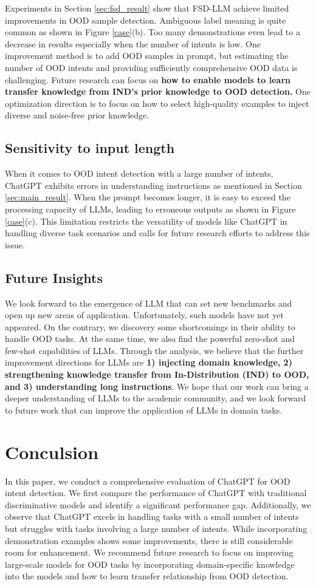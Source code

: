 \documentclass[10pt, a4paper]{article}
\begin{document}
Experiments in Section \ref{sec:fsd_result} show that FSD-LLM achieve limited improvements in OOD sample detection. Ambiguous label meaning is quite common as shown in Figure \ref{case}(b). Too many demonstrations even lead to a decrease in results especially when the number of intents is low. One improvement method is to add OOD samples in prompt, but estimating the number of OOD intents and providing sufficiently comprehensive OOD data is challenging. Future research can focus on \textbf{how to enable models to learn transfer knowledge from IND's prior knowledge to OOD detection.} One optimization direction is to focus on how to select high-quality examples to inject diverse and noise-free prior knowledge.

\subsection{Sensitivity to input length}
When it comes to OOD intent detection  with a large number of intents, ChatGPT exhibits errors in understanding instructions as mentioned in Section \ref{sec:main_result}. When the prompt becomes longer, it is easy to exceed the processing capacity of LLMs, leading to erroneous outputs as shown in Figure \ref{case}(c). This limitation restricts the versatility of models like ChatGPT in handling diverse task scenarios and calls for future research efforts to address this issue.
\subsection{Future Insights}
We look forward to the emergence of LLM that can set new benchmarks and open up new areas of application. Unfortunately, such models have not yet appeared. On the contrary, we discovery some shortcomings in their ability to handle OOD tasks. At the same time, we also find the powerful zero-shot and few-shot capabilities of LLMs. Through the analysis, we believe that the further improvement directions for LLMs are \textbf{1) injecting domain knowledge, 2) strengthening knowledge transfer from In-Distribution (IND) to OOD, and 3) understanding long instructions}. We hope that our work can bring a deeper understanding of LLMs to the academic community, and we look forward to future work that can improve the application of LLMs in domain tasks.

\section{Conculsion}
In this paper, we conduct a comprehensive evaluation of ChatGPT for OOD intent detection. We first compare the performance of ChatGPT with traditional discriminative models and identify a significant performance gap. Additionally, we observe that ChatGPT excels in handling tasks with a small number of intents but struggles with tasks involving a large number of intents. While incorporating demonstration examples shows some improvements, there is still considerable room for enhancement. We recommend future research to focus on improving large-scale models for OOD tasks by incorporating domain-specific knowledge into the models and how to learn transfer relationship from OOD detection.
\end{document}
